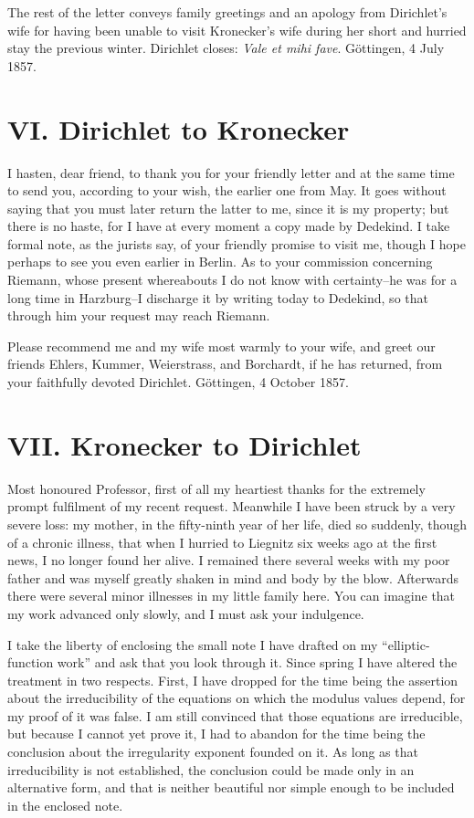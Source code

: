 \documentclass[11pt]{article}
\begin{document}
The rest of the letter conveys family greetings and an apology from Dirichlet's wife for having been unable to visit Kronecker's wife during her short and hurried stay the previous winter. Dirichlet closes: \emph{Vale et mihi fave}. Göttingen, 4 July 1857.

\section*{VI. Dirichlet to Kronecker}
I hasten, dear friend, to thank you for your friendly letter and at the same time to send you, according to your wish, the earlier one from May. It goes without saying that you must later return the latter to me, since it is my property; but there is no haste, for I have at every moment a copy made by Dedekind. I take formal note, as the jurists say, of your friendly promise to visit me, though I hope perhaps to see you even earlier in Berlin. As to your commission concerning Riemann, whose present whereabouts I do not know with certainty--he was for a long time in Harzburg--I discharge it by writing today to Dedekind, so that through him your request may reach Riemann.

Please recommend me and my wife most warmly to your wife, and greet our friends Ehlers, Kummer, Weierstrass, and Borchardt, if he has returned, from your faithfully devoted Dirichlet. Göttingen, 4 October 1857.

\section*{VII. Kronecker to Dirichlet}
Most honoured Professor, first of all my heartiest thanks for the extremely prompt fulfilment of my recent request. Meanwhile I have been struck by a very severe loss: my mother, in the fifty-ninth year of her life, died so suddenly, though of a chronic illness, that when I hurried to Liegnitz six weeks ago at the first news, I no longer found her alive. I remained there several weeks with my poor father and was myself greatly shaken in mind and body by the blow. Afterwards there were several minor illnesses in my little family here. You can imagine that my work advanced only slowly, and I must ask your indulgence.

I take the liberty of enclosing the small note I have drafted on my ``elliptic-function work'' and ask that you look through it. Since spring I have altered the treatment in two respects. First, I have dropped for the time being the assertion about the irreducibility of the equations on which the modulus values depend, for my proof of it was false. I am still convinced that those equations are irreducible, but because I cannot yet prove it, I had to abandon for the time being the conclusion about the irregularity exponent founded on it. As long as that irreducibility is not established, the conclusion could be made only in an alternative form, and that is neither beautiful nor simple enough to be included in the enclosed note.
\end{document}
